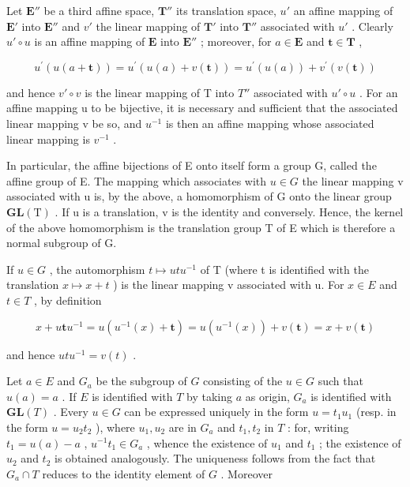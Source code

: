 Let \(\mathbf{E}''\) be a third affine space, \(\mathbf{T}''\) its translation space, \(u'\) an affine mapping of \(\mathbf{E}'\) into \(\mathbf{E}''\) and \(v'\) the linear mapping of \(\mathbf{T}'\) into \(\mathbf{T}''\) associated with \(u'\) . Clearly \(u' \circ u\) is an affine mapping of \(\mathbf{E}\) into \(\mathbf{E}''\) ; moreover, for \(a \in \mathbf{E}\) and \(\mathbf{t} \in \mathbf{T}\) ,

\[
u ^ {\prime} (u (a + \mathbf {t})) = u ^ {\prime} (u (a) + v (\mathbf {t})) = u ^ {\prime} (u (a)) + v ^ {\prime} (v (\mathbf {t}))
\]

and hence \(v'\circ v\) is the linear mapping of T into \(T''\) associated with \(u'\circ u\) . For an affine mapping u to be bijective, it is necessary and sufficient that the associated linear mapping v be so, and \(u^{-1}\) is then an affine mapping whose associated linear mapping is \(v^{-1}\) .

In particular, the affine bijections of E onto itself form a group G, called the affine group of E. The mapping which associates with \(u \in G\) the linear mapping v associated with u is, by the above, a homomorphism of G onto the linear group \(\mathbf{GL}(\mathrm{T})\) . If u is a translation, v is the identity and conversely. Hence, the kernel of the above homomorphism is the translation group T of E which is therefore a normal subgroup of G.

If \(u \in G\) , the automorphism \(t \mapsto utu^{-1}\) of T (where t is identified with the translation \(x \mapsto x + t\) ) is the linear mapping v associated with u. For \(x \in E\) and \(t \in T\) , by definition

\[
x + u \mathbf {t} u ^ {- 1} = u (u ^ {- 1} (x) + \mathbf {t}) = u (u ^ {- 1} (x)) + v (\mathbf {t}) = x + v (\mathbf {t})
\]

and hence \(utu^{-1} = v(t)\) .

Let \(a \in E\) and \(G_a\) be the subgroup of \(G\) consisting of the \(u \in G\) such that \(u(a) = a\) . If \(E\) is identified with \(T\) by taking \(a\) as origin, \(G_a\) is identified with \(\mathbf{GL}(T)\) . Every \(u \in G\) can be expressed uniquely in the form \(u = t_1 u_1\) (resp. in the form \(u = u_2 t_2\) ), where \(u_1, u_2\) are in \(G_a\) and \(t_1, t_2\) in \(T\) : for, writing \(t_1 = u(a) - a\) , \(u^{-1} t_1 \in G_a\) , whence the existence of \(u_1\) and \(t_1\) ; the existence of \(u_2\) and \(t_2\) is obtained analogously. The uniqueness follows from the fact that \(G_a \cap T\) reduces to the identity element of \(G\) . Moreover

